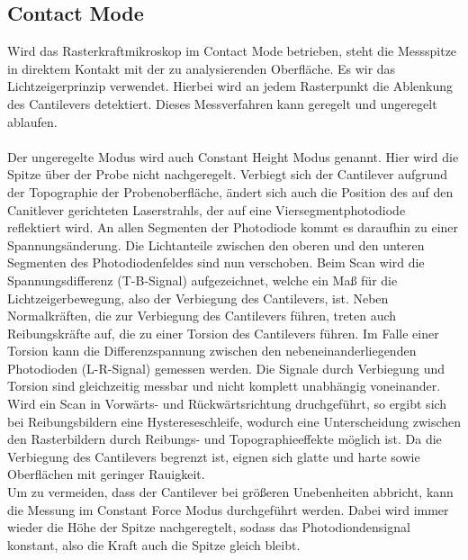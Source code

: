 \subsection{Contact Mode}
Wird das Rasterkraftmikroskop im Contact Mode betrieben, steht die Messspitze in direktem Kontakt mit der zu analysierenden Oberfläche. Es wir das Lichtzeigerprinzip verwendet. Hierbei wird an jedem Rasterpunkt die Ablenkung des Cantilevers detektiert. Dieses Messverfahren kann geregelt und ungeregelt ablaufen.\\
\\
Der ungeregelte Modus wird auch Constant Height Modus genannt. Hier wird die Spitze über der Probe nicht nachgeregelt. Verbiegt sich der Cantilever aufgrund der Topographie der Probenoberfläche, ändert sich auch die Position des auf den Canitlever gerichteten Laserstrahls, der auf eine Viersegmentphotodiode reflektiert wird. An allen Segmenten der Photodiode kommt es daraufhin zu einer 
Spannungsänderung. Die Lichtanteile zwischen den oberen und den unteren Segmenten des Photodiodenfeldes sind nun verschoben. Beim Scan wird die Spannungsdifferenz (T-B-Signal) aufgezeichnet, welche ein Maß für die Lichtzeigerbewegung, also der Verbiegung des Cantilevers, ist. Neben Normalkräften, die zur Verbiegung des Cantilevers führen, treten auch Reibungskräfte auf, die zu einer Torsion des Cantilevers führen. Im Falle einer Torsion kann die Differenzspannung zwischen den nebeneinanderliegenden Photodioden (L-R-Signal) gemessen werden. Die Signale durch Verbiegung und Torsion sind gleichzeitig messbar und nicht komplett unabhängig voneinander. Wird ein Scan in Vorwärts- und Rückwärtsrichtung druchgeführt, so ergibt sich bei Reibungsbildern eine Hystereseschleife, wodurch eine Unterscheidung zwischen den Rasterbildern durch Reibungs- und Topographieeffekte möglich ist.
Da die Verbiegung des Cantilevers begrenzt ist, eignen sich glatte und harte sowie Oberflächen mit geringer Rauigkeit.\\

Um zu vermeiden, dass der Cantilever bei größeren Unebenheiten abbricht, kann die Messung im Constant Force Modus durchgeführt werden. Dabei wird immer wieder die Höhe der Spitze nachgeregtelt, sodass das Photodiondensignal konstant, also die Kraft auch die Spitze gleich bleibt. 


